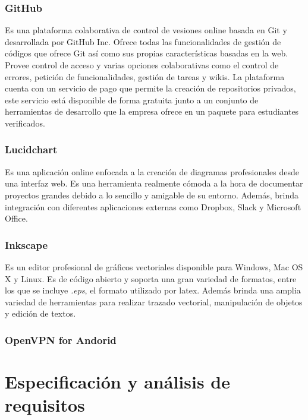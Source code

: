 \documentclass[12pt]{article}
\begin{document}
        \subsubsection{GitHub}
            Es una plataforma colaborativa de control de vesiones online basada en Git y desarrollada por GitHub Inc. Ofrece todas las funcionalidades de gestión de códigos que ofrece Git así como sus propias características basadas en la web. Provee control de acceso y varias opciones colaborativas como el control de errores, petición de funcionalidades, gestión de tareas y wikis. La plataforma cuenta con un servicio de pago que permite la creación de repositorios privados, este servicio está disponible de forma gratuita junto a un conjunto de herramientas de desarrollo que la empresa ofrece en un paquete para estudiantes verificados.

        \subsubsection{Lucidchart}
            Es una aplicación online enfocada a la creación de diagramas profesionales desde una interfaz web. Es una herramienta realmente cómoda a la hora de documentar proyectos grandes debido a lo sencillo y amigable de su entorno. Además, brinda integración con diferentes aplicaciones externas como Dropbox, Slack y Microsoft Office. 

        \subsubsection{Inkscape}
            Es un editor profesional de gráficos vectoriales disponible para Windows, Mac OS X y Linux. Es de código abierto y soporta una gran variedad de formatos, entre los que se incluye \textit{.eps}, el formato utilizado por latex. Además brinda una amplia variedad de herramientas para realizar trazado vectorial, manipulación de objetos y edición de textos.

        \subsubsection{OpenVPN for Andorid}


\section{Especificación y análisis de requisitos}
    
\end{document}
